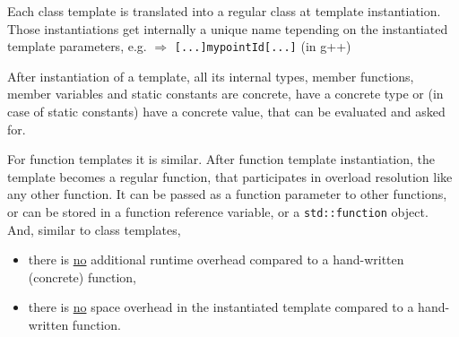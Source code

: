 Each class template is translated into a regular class at template instantiation. Those instantiations get internally a unique name tepending on the
instantiated template parameters, e.g.  $\Rightarrow$ \texttt{[...]mypointId[...]} (in g++)

After instantiation of a template, all its internal types, member functions, member variables and static constants are concrete, have a concrete type
or (in case of static constants) have a concrete value, that can be evaluated and asked for.

For function templates it is similar. After function template instantiation, the template becomes a regular function, that participates in overload
resolution like any other function. It can be passed as a function parameter to other functions, or can be stored in a function reference variable,
or a \texttt{std::function} object. And, similar to class templates,
\begin{itemize}
  \item there is \underline{no} additional runtime overhead compared to a hand-written (concrete) function,
  \item there is \underline{no} space overhead in the instantiated template compared to a hand-written function.
\end{itemize}
